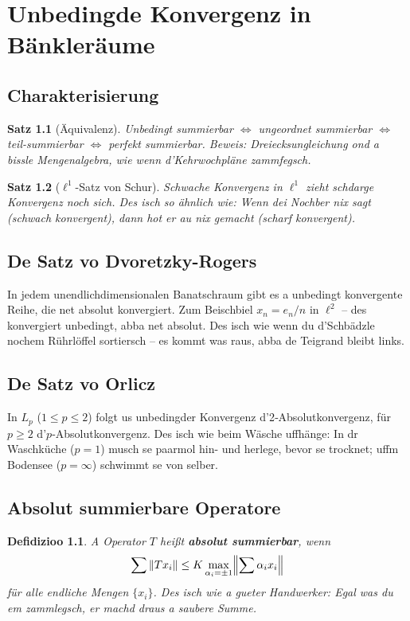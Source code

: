\documentclass[12pt,a4paper]{scrbook}
\newtheorem{theorem}{Satz}[chapter]
\newtheorem{definition}{Defidizioo}[chapter]
\begin{document}
	\chapter{Unbedingde Konvergenz in Bänkleräume}
	\section{Charakterisierung}
	\begin{theorem}[Äquivalenz]
		Unbedingt summierbar \(\iff\) ungeordnet summierbar \(\iff\) teil-summierbar \(\iff\) perfekt summierbar. Beweis: Dreiecksungleichung ond a bissle Mengenalgebra, wie wenn d’Kehrwochpläne zammfegsch.
	\end{theorem}
	
	\begin{theorem}[\(\ell^1\)-Satz von Schur]
		Schwache Konvergenz in \(\ell^1\) zieht schdarge Konvergenz noch sich. Des isch so ähnlich wie: Wenn dei Nochber nix sagt (schwach konvergent), dann hot er au nix gemacht (scharf konvergent).
	\end{theorem}
	
	\section{De Satz vo Dvoretzky-Rogers}
	In jedem unendlichdimensionalen Banatschraum gibt es a unbedingt konvergente Reihe, die net absolut konvergiert. Zum Beischbiel \(x_n = e_n/n\) in \(\ell^2\) – des konvergiert unbedingt, abba net absolut. Des isch wie wenn du d’Schbädzle nochem Rührlöffel sortiersch – es kommt was raus, abba de Teigrand bleibt links.
	
	\section{De Satz vo Orlicz}
	In \(L_p\) (\(1\le p\le2\)) folgt us unbedingder Konvergenz d’2‑Absolutkonvergenz, für \(p\ge2\) d’\(p\)‑Absolutkonvergenz. Des isch wie beim Wäsche uffhänge: In dr Waschküche (\(p=1\)) musch se paarmol hin- und herlege, bevor se trocknet; uffm Bodensee (\(p=\infty\)) schwimmt se von selber.
	
	\section{Absolut summierbare Operatore}
	\begin{definition}
		A Operator \(T\) heißt \textbf{absolut summierbar}, wenn 
		\[
		\sum \|Tx_i\| \le K \max_{\alpha_i=\pm1}\Bigl\|\sum \alpha_i x_i\Bigr\|
		\]
		für alle endliche Mengen \(\{x_i\}\). Des isch wie a gueter Handwerker: Egal was du em zammlegsch, er machd draus a saubere Summe.
	\end{definition}
	
\end{document}
